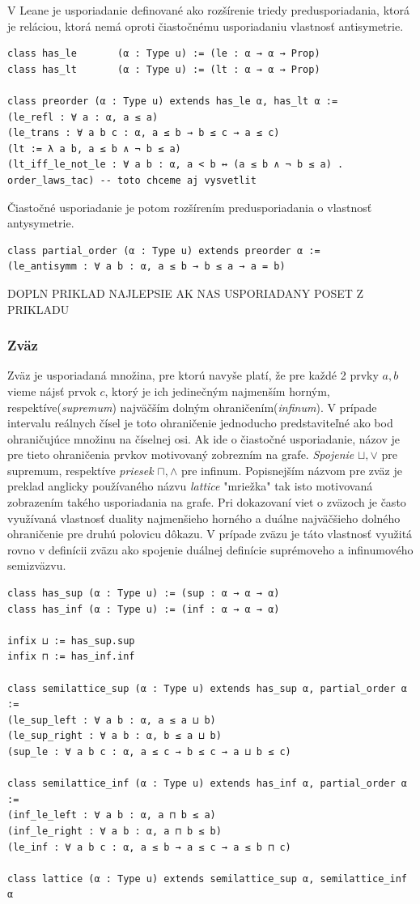 \documentclass[a4paper,10pt,oneside]{report}%
\begin{document}
    V Leane je usporiadanie definované ako rozšírenie triedy predusporiadania, ktorá
je reláciou, ktorá nemá oproti čiastočnému usporiadaniu vlastnosť antisymetrie.

\begin{lstlisting}
class has_le       (α : Type u) := (le : α → α → Prop)
class has_lt       (α : Type u) := (lt : α → α → Prop)

class preorder (α : Type u) extends has_le α, has_lt α :=
(le_refl : ∀ a : α, a ≤ a)
(le_trans : ∀ a b c : α, a ≤ b → b ≤ c → a ≤ c)
(lt := λ a b, a ≤ b ∧ ¬ b ≤ a)
(lt_iff_le_not_le : ∀ a b : α, a < b ↔ (a ≤ b ∧ ¬ b ≤ a) . order_laws_tac) -- toto chceme aj vysvetlit
\end{lstlisting}
Čiastočné usporiadanie je potom rozšírením predusporiadania o vlastnosť antysymetrie.
\begin{lstlisting}
class partial_order (α : Type u) extends preorder α :=
(le_antisymm : ∀ a b : α, a ≤ b → b ≤ a → a = b)
\end{lstlisting}

DOPLN PRIKLAD NAJLEPSIE AK NAS USPORIADANY POSET Z PRIKLADU

\subsubsection{Zväz}
    Zväz je usporiadaná množina, pre ktorú navyše platí, že pre každé 2 prvky $a, b$
vieme nájsť prvok $c$, ktorý je ich jedinečným najmenším horným, respektíve(\emph{supremum})
najväčším dolným ohraničením(\emph{infinum}).
    V prípade intervalu reálnych čísel je toto ohraničenie jednoducho predstaviteľné
ako bod ohraničujúce množinu na číselnej osi.
    Ak ide o čiastočné usporiadanie, názov je pre tieto ohraničenia prvkov
motivovaný zobrezním na grafe.
    \emph{Spojenie} $\sqcup, \vee$ pre supremum, respektíve \emph{priesek} $\sqcap, \wedge$ pre infinum.
    Popisnejším názvom pre zväz je preklad anglicky používaného názvu \emph{lattice}
"mriežka" tak isto motivovaná zobrazením takého usporiadania na grafe.
    Pri dokazovaní viet o zväzoch je často využívaná vlastnosť duality najmenšieho
horného a duálne najväčšieho dolného ohraničenie pre druhú polovicu dôkazu.
    V prípade zväzu je táto vlastnosť využitá rovno v definícii zväzu ako spojenie
duálnej definície suprémoveho a infinumového semizväzvu.

\begin{lstlisting}
class has_sup (α : Type u) := (sup : α → α → α)
class has_inf (α : Type u) := (inf : α → α → α)

infix ⊔ := has_sup.sup
infix ⊓ := has_inf.inf

class semilattice_sup (α : Type u) extends has_sup α, partial_order α :=
(le_sup_left : ∀ a b : α, a ≤ a ⊔ b)
(le_sup_right : ∀ a b : α, b ≤ a ⊔ b)
(sup_le : ∀ a b c : α, a ≤ c → b ≤ c → a ⊔ b ≤ c)

class semilattice_inf (α : Type u) extends has_inf α, partial_order α :=
(inf_le_left : ∀ a b : α, a ⊓ b ≤ a)
(inf_le_right : ∀ a b : α, a ⊓ b ≤ b)
(le_inf : ∀ a b c : α, a ≤ b → a ≤ c → a ≤ b ⊓ c)

class lattice (α : Type u) extends semilattice_sup α, semilattice_inf α
\end{lstlisting}
\end{document}
